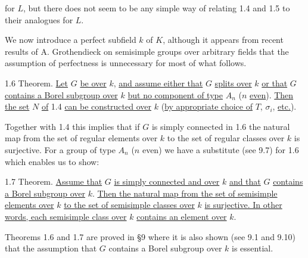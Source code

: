 
for $L$, but there does not seem to be any simple way of relating 1.4 and 1.5 to their analogues for $L$.

We now introduce a perfect subfield $k$ of $K$, although it appears from recent results of A. Grothendieck on semisimple groups over arbitrary fields that the assumption of perfectness is unnecessary for most of what follows.

1.6 Theorem. \uline{Let} $G$ \uline{be over} $k$, \uline{and assume either that} $G$ \uline{splits over} $k$ \uline{or that} $G$ \uline{contains a Borel subgroup over} $k$ \uline{but no component of type} $A_n$ ($n$ \uline{even}). \uline{Then the set} $N$ \uline{of} 1.4 \uline{can be constructed over} $k$ (\uline{by appropriate choice of} $T$, $\sigma_i$, \uline{etc.}).

Together with 1.4 this implies that if $G$ is simply connected in 1.6 the natural map from the set of regular elements over $k$ to the set of regular classes over $k$ is surjective. For a group of type $A_n$ ($n$ even) we have a substitute (see 9.7) for 1.6 which enables us to show:

1.7 Theorem. \uline{Assume that} $G$ \uline{is simply connected and over} $k$ \uline{and that} $G$ \uline{contains a Borel subgroup over} $k$. \uline{Then the natural map from the set of semisimple elements over} $k$ \uline{to the set of semisimple classes over} $k$ \uline{is surjective. In other words, each semisimple class over} $k$ \uline{contains an element over} $k$.

Theorems 1.6 and 1.7 are proved in \S9 where it is also shown (see 9.1 and 9.10) that the assumption that $G$ contains a Borel subgroup over $k$ is essential.

